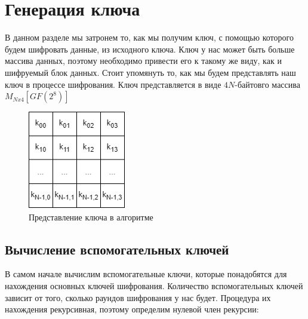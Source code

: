 \documentclass[12pt]{article}
\begin{document}
\section{Генерация ключа}
В данном разделе мы затронем то, как мы получим ключ, с помощью которого будем шифровать данные, из исходного ключа. Ключ у нас может быть больше массива данных, поэтому необходимо привести его к такому же виду, как и шифруемый блок данных. Стоит упомянуть то, как мы будем представлять наш ключ в процессе шифрования. Ключ представляется в виде $4N$-байтовго массива $M_{Nx4}[GF(2^{8})]$

\begin{figure}[h]
    \centering
    \includegraphics[width=0.18\linewidth]{key.png}
    \caption{Представление ключа в алгоритме}
    \label{fig:scheme}
\end{figure}

\subsection{Вычисление вспомогательных ключей}
В самом начале вычислим вспомогательные ключи, которые понадобятся для нахождения основных ключей шифрования. Количество вспомогательных ключей зависит от того, сколько раундов шифрования у нас будет. Процедура их нахождения рекурсивная, поэтому определим нулевой член рекурсии:
\end{document}

